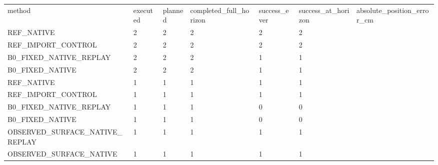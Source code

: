 \begin{tabular}{lllllll}
method & executed & planned & completed\_full\_horizon & success\_ever & success\_at\_horizon & absolute\_position\_error\_cm \\
REF\_NATIVE & 2 & 2 & 2 & 2 & 2 &  \\
REF\_IMPORT\_CONTROL & 2 & 2 & 2 & 2 & 2 &  \\
B0\_FIXED\_NATIVE\_REPLAY & 2 & 2 & 2 & 1 & 1 &  \\
B0\_FIXED\_NATIVE & 2 & 2 & 2 & 1 & 1 &  \\
REF\_NATIVE & 1 & 1 & 1 & 1 & 1 &  \\
REF\_IMPORT\_CONTROL & 1 & 1 & 1 & 1 & 1 &  \\
B0\_FIXED\_NATIVE\_REPLAY & 1 & 1 & 1 & 0 & 0 &  \\
B0\_FIXED\_NATIVE & 1 & 1 & 1 & 0 & 0 &  \\
OBSERVED\_SURFACE\_NATIVE\_REPLAY & 1 & 1 & 1 & 1 & 1 &  \\
OBSERVED\_SURFACE\_NATIVE & 1 & 1 & 1 & 1 & 1 &  \\
\end{tabular}
